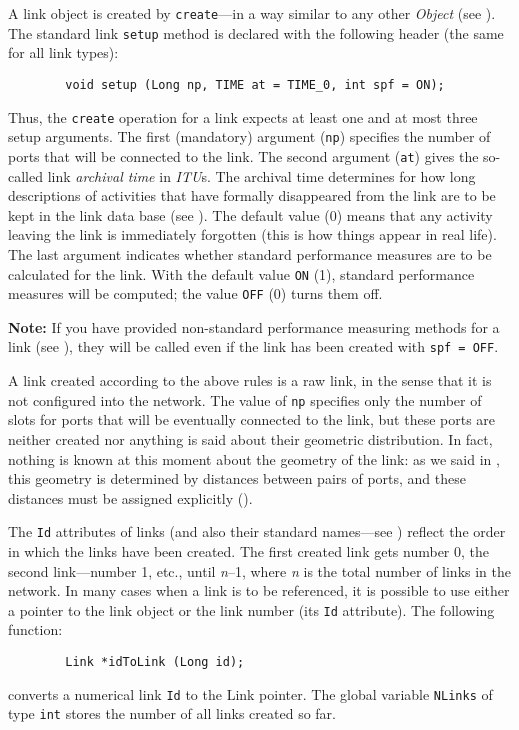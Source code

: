 A link object is created by {\tt create}---in a way similar to
any other {\em Object\/} (see ).
The standard link {\tt setup} method is declared with the following header
(the same for all link types):
\begin{verbatim}
        void setup (Long np, TIME at = TIME_0, int spf = ON);
\end{verbatim}
Thus, the {\tt create} operation for a link expects
at least one and at most three setup arguments.
The first (mandatory) argument ({\tt np}) specifies the number
of ports that will be connected to the link.
The second argument ({\tt at}) gives the so-called link {\em archival time\/}
in {\em ITU\/}s.
The archival time determines for how long descriptions of activities that
have formally disappeared from the link are to be kept in the link
data base (see ).
The default value (0) means that any activity leaving the link is immediately
forgotten (this is how things appear in real life).
The last argument indicates whether standard performance measures
are to be calculated for the link.
With the default value {\tt ON} (1), standard performance measures will be
computed;
the value {\tt OFF} (0) turns them off.

\medskip

\noindent
{\bf Note:} If you have provided non-standard performance measuring
methods for a link (see ), they will be called even if
the link has been created with {\tt spf = OFF}.

\medskip

A link created according to the above rules is a raw link, in the sense that
it is not configured into the network.
The value of {\tt np} specifies only the number of slots for ports that
will be eventually connected to the link,
but these ports are neither created nor anything is said
about their geometric distribution.
In fact, nothing is known at this moment
about the geometry of the link: as we said
in , this geometry is determined by distances
between pairs of ports, and these distances must be assigned
explicitly ().

The {\tt Id} attributes of links (and also their standard names---see
) reflect the order in which the links have been created.
The first created link gets number 0, the second link---number 1, etc., until
{\em n\/}--1, where {\em n\/} is the total number of links in the network.
In many cases when a link is to be referenced, it is possible to use either
a pointer to the link object or the link number (its {\tt Id} attribute).
The following function:
\begin{verbatim}
        Link *idToLink (Long id);
\end{verbatim}
converts a numerical link {\tt Id} to the Link pointer.
The global variable {\tt NLinks} of type {\tt int} stores the number of
all links created so far.

